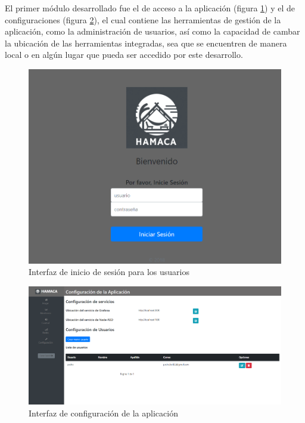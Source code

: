 El primer módulo desarrollado fue el de acceso a la aplicación (figura \ref{fig:login_ui}) y el de configuraciones (figura \ref{fig:hamaca_config}), el cual contiene las herramientas de gestión de la aplicación, como la administración de usuarios, así como la capacidad de cambar la ubicación de las herramientas integradas, sea que se encuentren de manera local o en algún lugar que pueda ser accedido por este desarrollo.\\
\begin{figure}[!htb]
\centering
\includegraphics[scale=0.285]{./Figuras/login_ui.png}
\caption{Interfaz de inicio de sesión para los usuarios}
\label{fig:login_ui}
\vspace*{-10pt}
\end{figure}

\begin{figure}[!htb]
\centering
\includegraphics[scale=0.21]{./Figuras/hamaca_config.png}
\caption{Interfaz de configuración de la aplicación}
\label{fig:hamaca_config}
\vspace*{-10pt}
\end{figure}

